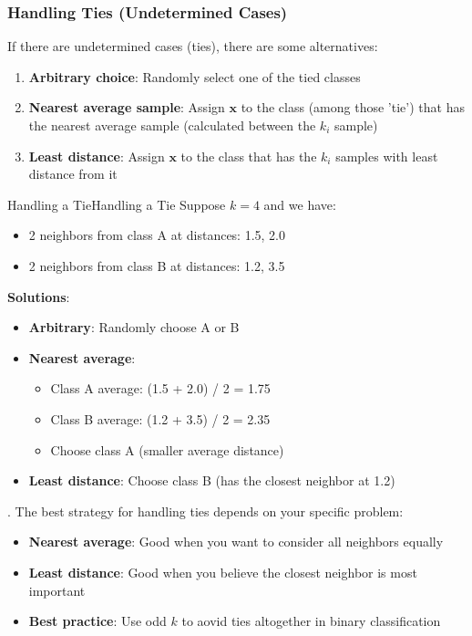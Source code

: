 \documentclass[a4paper]{article}
\theoremstyle{definition}
\begin{document}
\subsubsection{Handling Ties (Undetermined Cases)}
If there are undetermined cases (ties), there are some alternatives:
\begin{enumerate}
    \item \textbf{Arbitrary choice}: Randomly select one of the tied classes 
    \item \textbf{Nearest average sample}: Assign \( \mathbf{x} \) to the class (among those 'tie') that has the nearest average sample (calculated between the \( k_i \) sample)
    \item \textbf{Least distance}: Assign \( \mathbf{x} \) to the class that has the \( k_i \) samples with least distance from it
\end{enumerate}
\begin{example}{Handling a Tie}{Handling a Tie}
Suppose \( k = 4 \) and we have:
\begin{itemize}
    \item 2 neighbors from class A at distances: 1.5, 2.0
    \item 2 neighbors from class B at distances: 1.2, 3.5
\end{itemize}
\textbf{Solutions}:
\begin{itemize}
    \item \textbf{Arbitrary}: Randomly choose A or B 
    \item \textbf{Nearest average}:
    \begin{itemize}
        \item Class A average: (1.5 + 2.0) / 2 = 1.75
        \item Class B average: (1.2 + 3.5) / 2 = 2.35
        \item Choose class A (smaller average distance)
    \end{itemize}
    \item \textbf{Least distance}: Choose class B (has the closest neighbor at 1.2)
\end{itemize}
. The best strategy for handling ties depends on your specific problem:
\begin{itemize}
    \item \textbf{Nearest average}: Good when you want to consider all neighbors equally 
    \item \textbf{Least distance}: Good when you believe the closest neighbor is most important 
    \item \textbf{Best practice}: Use odd \( k \) to aovid ties altogether in binary classification
\end{itemize}
\end{example}
\end{document}

